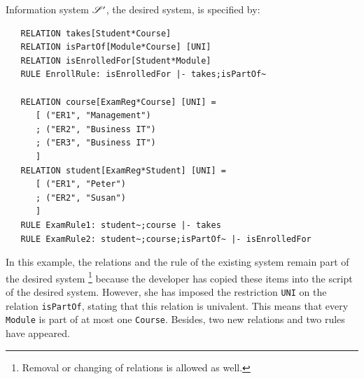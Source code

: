 \documentclass{elsarticle}
\begin{document}
   Information system $\mathscr{S}'$, the desired system, is specified by:
\begin{verbatim}
   RELATION takes[Student*Course]
   RELATION isPartOf[Module*Course] [UNI]
   RELATION isEnrolledFor[Student*Module]
   RULE EnrollRule: isEnrolledFor |- takes;isPartOf~
   
   RELATION course[ExamReg*Course] [UNI] =
      [ ("ER1", "Management")
      ; ("ER2", "Business IT")
      ; ("ER3", "Business IT")
      ]
   RELATION student[ExamReg*Student] [UNI] =
      [ ("ER1", "Peter")
      ; ("ER2", "Susan")
      ]
   RULE ExamRule1: student~;course |- takes
   RULE ExamRule2: student~;course;isPartOf~ |- isEnrolledFor
\end{verbatim}
   In this example, the relations and the rule of the existing system remain part of the desired system%
\footnote{Removal or changing of relations is allowed as well.}
   because the developer has copied these items into the script of the desired system.
   However, she has imposed the restriction \verb-UNI- on the relation {\tt isPartOf}, stating that this relation is univalent.
   This means that every \verb-Module- is part of at most one \verb-Course-.
   Besides, two new relations and two rules have appeared.
\end{document}
